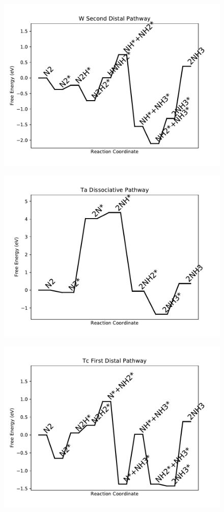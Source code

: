 \begin{figure}
\centering
\includegraphics[width=0.8\linewidth]{data/plots/W_distal_2.pdf}
\end{figure}

\begin{figure}
\centering
\includegraphics[width=0.8\linewidth]{data/plots/Ta_dissociative.pdf}
\end{figure}

\begin{figure}
\centering
\includegraphics[width=0.8\linewidth]{data/plots/Tc_distal_1.pdf}
\end{figure}

